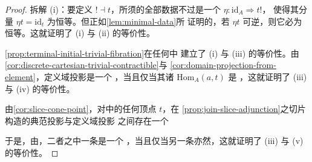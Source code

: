\begin{proof}
拆解 (i)：要定义\trAdjunction{} $!\dashv t$，所须的全部数据不过是一个%
\trUnit{}\trNaturalTransformation{} $\eta\colon\mathrm{id}_{A}\Rightarrow t!$，%
使得其分量 $\eta t=\mathrm{id}_{t}$ 为恒等。但正如\cref{lem:minimal-data}所%
证明的，若 $\eta t$ 可逆，则它必为恒等。这就证明了 (i) 与 (ii) 的等价性。

\cref{prop:terminal-initial-trivial-fibration}在任何\trInfinityCosmos{}中
建立了 (i) 与 (iii) 的等价性。由\cref{cor:discrete-cartesian-trivial-contractible}与%
\cref{cor:domain-projection-from-element}，定义域投影\trFunctor{}是一个%
\trTrivialFibration，当且仅当其诸\trFiber{} $\mathrm{Hom}_{A}(a,t)$ 是%
\trContractible{}，这就证明了 (iii) 与 (iv) 的等价性。

由\cref{cor:slice-cone-point}，对\trQuasiCategory{}中的任何顶点 $t$，在%
\cref{prop:join-slice-adjunction}之切片构造的典范投影与定义域投影%
\trIsofibration{}之间存在一个\trEquivalence
\begin{center}
\end{center}
于是，由\trTwoOfThreeProperty，二者之中一条\trIsofibration{}是一个%
\trEquivalence，当且仅当另一条亦然，这就证明了 (iii) 与 (v) 的等价性。


\end{proof}
